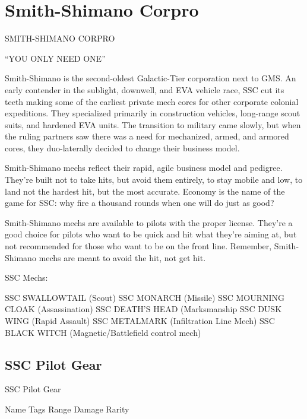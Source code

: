 \section{Smith-Shimano Corpro}

 SMITH-SHIMANO CORPRO   

                                        “YOU ONLY NEED ONE”  

Smith-Shimano is the second-oldest Galactic-Tier corporation next to GMS. An early  
contender in the sublight, downwell, and EVA vehicle race, SSC cut its teeth making some of the  
earliest private mech cores for other corporate colonial expeditions. They specialized primarily in  
construction vehicles, long-range scout suits, and hardened EVA units. The transition to military  
came slowly, but when the ruling partners saw there was a need for mechanized, armed, and  
armored cores, they duo-laterally decided to change their business model.
 

Smith-Shimano mechs reflect their rapid, agile business model and pedigree. They’re built not to  
take hits, but avoid them entirely, to stay mobile and low, to land not the hardest hit, but the most  
accurate. Economy is the name of the game for SSC: why fire a thousand rounds when one will  
do just as good?
 

Smith-Shimano mechs are available to pilots with the proper license. They’re a good choice for  
pilots who want to be quick and hit what they’re aiming at, but not recommended for those who  
want to be on the front line. Remember, Smith-Shimano mechs are meant to avoid the hit, not  
get hit.  
 

SSC Mechs:
 

SSC SWALLOWTAIL (Scout)  
SSC MONARCH (Missile)  
SSC MOURNING CLOAK (Assassination)  
SSC DEATH’S HEAD (Marksmanship  
SSC DUSK WING (Rapid Assault)  
SSC METALMARK (Infiltration Line Mech)  
SSC BLACK WITCH (Magnetic/Battlefield control mech)  

                                                                                                         
\subsection{SSC Pilot Gear}

                                                SSC Pilot Gear  

  Name                  Tags                                       Range            Damage                     Rarity 

